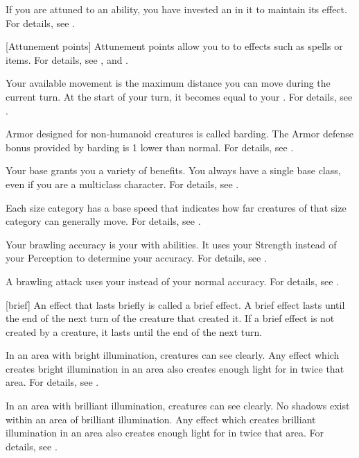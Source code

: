  If you are attuned to an ability, you have invested an  in it to maintain its effect.
For details, see .

[Attunement points] Attunement points allow you to  to effects such as spells or items.
For details, see , and .

 Your available movement is the maximum distance you can move during the current turn.
At the start of your turn, it becomes equal to your .
For details, see .

 Armor designed for non-humanoid creatures is called barding.
The Armor defense bonus provided by barding is 1 lower than normal.
For details, see .

 Your base  grants you a variety of benefits.
You always have a single base class, even if you are a multiclass character.
For details, see .

 Each size category has a base speed that indicates how far creatures of that size category can generally move.
For details, see .

 Your brawling accuracy is your  with \atBrawling abilities.
It uses your Strength instead of your Perception to determine your accuracy.
For details, see .

 A brawling attack uses your  instead of your normal accuracy.
For details, see .

[brief] An effect that lasts briefly is called a brief effect.
A brief effect lasts until the end of the next turn of the creature that created it.
If a brief effect is not created by a creature, it lasts until the end of the next turn.

 In an area with bright illumination, creatures can see clearly.
Any effect which creates bright illumination in an area also creates enough light for  in twice that area.
For details, see .

 In an area with brilliant illumination, creatures can see clearly.
No shadows exist within an area of brilliant illumination.
Any effect which creates brilliant illumination in an area also creates enough light for  in twice that area.
For details, see .

